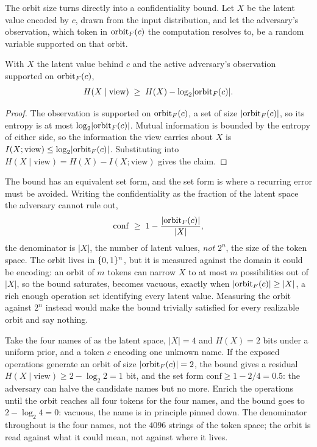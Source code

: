 The orbit size turns directly into a confidentiality bound. Let $X$ be the
latent value encoded by $c$, drawn from the input distribution, and let the
adversary's observation, which token in $\operatorname{orbit}_F(c)$ the computation
resolves to, be a random variable supported on that orbit.

\begin{theorem}
\label{thm:orbit-bound}
With $X$ the latent value behind $c$ and the active adversary's observation
supported on $\operatorname{orbit}_F(c)$,
\[
  H(X \mid \text{view}) \;\geq\; H(X) - \log_2 \lvert \operatorname{orbit}_F(c)\rvert .
\]
\end{theorem}

\begin{proof}
The observation is supported on $\operatorname{orbit}_F(c)$, a set of size
$\lvert\operatorname{orbit}_F(c)\rvert$, so its entropy is at most
$\log_2\lvert\operatorname{orbit}_F(c)\rvert$. Mutual information is bounded by the entropy
of either side, so the information the view carries about $X$ is
$I(X; \text{view}) \le \log_2\lvert\operatorname{orbit}_F(c)\rvert$. Substituting into
$H(X \mid \text{view}) = H(X) - I(X; \text{view})$ gives the claim.
\end{proof}

The bound has an equivalent set form, and the set form is where a recurring
error must be avoided. Writing the confidentiality as the fraction of the
latent space the adversary cannot rule out,
\[
  \mathrm{conf} \;\geq\; 1 - \frac{\lvert\operatorname{orbit}_F(c)\rvert}{\lvert X\rvert},
\]
the denominator is $\lvert X\rvert$, the number of latent values, \emph{not}
$2^n$, the size of the token space. The orbit lives in $\{0,1\}^n$, but it is
measured against the domain it could be encoding: an orbit of $m$ tokens can
narrow $X$ to at most $m$ possibilities out of $\lvert X\rvert$, so the bound
saturates, becomes vacuous, exactly when $\lvert\operatorname{orbit}_F(c)\rvert \ge \lvert
X\rvert$, a rich enough operation set identifying every latent value.
Measuring the orbit against $2^n$ instead would make the bound trivially
satisfied for every realizable orbit and say nothing.

\begin{example}
\label{ex:orbit-names}
Take the four names of  as the latent space,
$\lvert X\rvert = 4$ and $H(X) = 2$ bits under a uniform prior, and a token
$c$ encoding one unknown name. If the exposed operations generate an orbit
of size $\lvert\operatorname{orbit}_F(c)\rvert = 2$, the bound gives a residual
$H(X \mid \text{view}) \ge 2 - \log_2 2 = 1$ bit, and the set form
$\mathrm{conf} \ge 1 - 2/4 = 0.5$: the adversary can halve the candidate
names but no more. Enrich the operations until the orbit reaches all four
tokens for the four names, and the bound goes to $2 - \log_2 4 = 0$: vacuous,
the name is in principle pinned down. The denominator throughout is the four
names, not the $4096$ strings of the token space; the orbit is read against
what it could mean, not against where it lives.
\end{example}


